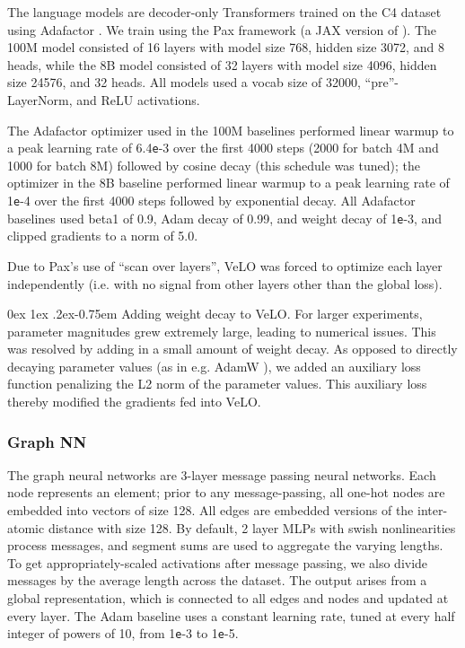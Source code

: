 \documentclass[11pt]{article}
\makeatletter
\renewcommand{\paragraph}{%
  \@startsection{paragraph}{4}%
  {\z@}{0ex \@plus 1ex \@minus .2ex}{-0.75em}%
  {\normalfont\normalsize\bfseries}%
}
\newcommand{\e}{\texttt{e}}
\makeatother
\begin{document}
The language models are decoder-only Transformers \citep{vaswani2017attention} trained on the C4 dataset \citep{raffel2020exploring} using Adafactor \citep{shazeer2018adafactor}. We train using the Pax framework (a JAX version of \cite{shen2019lingvo}). The 100M model consisted of 16 layers with model size 768, hidden size 3072, and 8 heads, while the 8B model consisted of 32 layers with model size 4096, hidden size 24576, and 32 heads. All models used a vocab size of 32000, ``pre''-LayerNorm, and ReLU activations.

The Adafactor optimizer used in the 100M baselines performed linear warmup to a peak learning rate of 6.4\e-3 over the first 4000 steps (2000 for batch 4M and 1000 for batch 8M) followed by cosine decay (this schedule was tuned); the optimizer in the 8B baseline performed linear warmup to a peak learning rate of 1\e-4 over the first 4000 steps followed by exponential decay. All Adafactor baselines used beta1 of 0.9, Adam decay of 0.99, and weight decay of 1\e-3, and clipped gradients to a norm of 5.0.

Due to Pax's use of ``scan over layers'', VeLO was forced to optimize each layer independently (i.e. with no signal from other layers other than the global loss).

\paragraph{Adding weight decay to VeLO.} For larger experiments, parameter magnitudes grew extremely large, leading to numerical issues. This was resolved by adding in a small amount of weight decay. As opposed to directly decaying parameter values (as in e.g. AdamW \citep{loshchilov2017decoupled}), we added an auxiliary loss function penalizing the L2 norm of the parameter values. This auxiliary loss thereby modified the gradients fed into VeLO. 

\subsubsection{Graph NN} \label{app:gnn_materials}
The graph neural networks are 3-layer message passing neural networks. Each node represents an element; prior to any message-passing, all one-hot nodes are embedded into vectors of size 128.
All edges are embedded versions of the inter-atomic distance with size 128.
By default, 2 layer MLPs with swish nonlinearities process messages, and segment sums are used to aggregate the varying lengths. To get appropriately-scaled activations after message passing, we also divide messages by the average length across the dataset. The output arises from a global representation, which is connected to all edges and nodes and updated at every layer. 
The Adam baseline uses a constant learning rate, tuned at every half integer of powers of 10, from 1\e-3 to 1\e-5.
\end{document}
